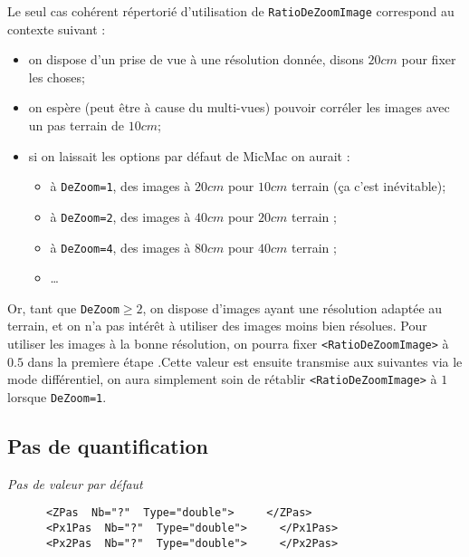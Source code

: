 Le seul cas coh\'erent r\'epertori\'e d'utilisation de  {\tt RatioDeZoomImage}
correspond au contexte suivant :

\begin{itemize}
   \item  on dispose d'un prise de vue \`a une r\'esolution donn\'ee,
          disons $20 cm$ pour fixer les choses;

    \item on esp\`ere (peut \^etre \`a cause du multi-vues) pouvoir
          corr\'eler les images avec un pas terrain de $10 cm$;

     \item si on laissait les options par d\'efaut de MicMac on
           aurait  :
     \begin{itemize}
           \item  \`a {\tt DeZoom=1}, des images \`a $20 cm$
              pour $10 cm$ terrain (\c{c}a c'est in\'evitable);

           \item  \`a {\tt DeZoom=2}, des images \`a $40 cm$
              pour $20 cm$ terrain ;

           \item  \`a {\tt DeZoom=4}, des images \`a $80 cm$
              pour $40 cm$ terrain ;
           \item  \dots
     \end{itemize}

\end{itemize}

Or, tant que  {\tt DeZoom$\geq2$}, on dispose d'images ayant une r\'esolution
adapt\'ee au terrain, et on n'a pas int\'er\^et \`a utiliser des images
moins bien r\'esolues.  Pour utiliser les images \`a la bonne
r\'esolution, on pourra fixer {\tt <RatioDeZoomImage>} \`a $0.5$
dans la prem\`iere \'etape .Cette valeur est ensuite transmise
aux suivantes via le mode diff\'erentiel, on aura simplement soin
de r\'etablir {\tt <RatioDeZoomImage>}  \`a $1$  lorsque {\tt DeZoom=1}.



\subsection{Pas de quantification}

\label{Pas:Quantif}

\emph{Pas de valeur par d\'efaut}
\begin{verbatim}
      <ZPas  Nb="?"  Type="double">     </ZPas>
      <Px1Pas  Nb="?"  Type="double">     </Px1Pas>
      <Px2Pas  Nb="?"  Type="double">     </Px2Pas>
\end{verbatim}

